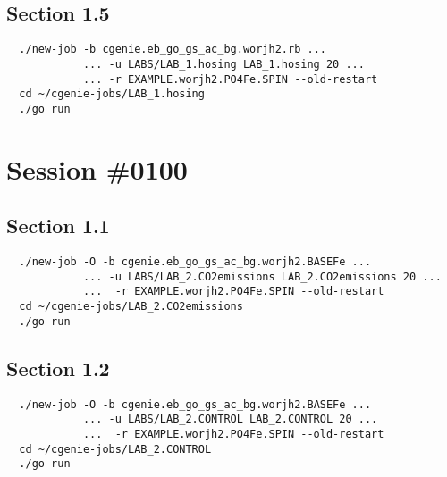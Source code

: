 \documentclass[a4paper,10pt,article]{memoir}
\begin{document}
\subsection*{Section 1.5}

\begin{verbatim}
  ./new-job -b cgenie.eb_go_gs_ac_bg.worjh2.rb ...
            ... -u LABS/LAB_1.hosing LAB_1.hosing 20 ...
            ... -r EXAMPLE.worjh2.PO4Fe.SPIN --old-restart
  cd ~/cgenie-jobs/LAB_1.hosing
  ./go run
\end{verbatim}

\section{Session \#0100}

\subsection*{Section 1.1}

\begin{verbatim}
  ./new-job -O -b cgenie.eb_go_gs_ac_bg.worjh2.BASEFe ...
            ... -u LABS/LAB_2.CO2emissions LAB_2.CO2emissions 20 ...
            ...  -r EXAMPLE.worjh2.PO4Fe.SPIN --old-restart
  cd ~/cgenie-jobs/LAB_2.CO2emissions
  ./go run
\end{verbatim}

\subsection*{Section 1.2}

\begin{verbatim}
  ./new-job -O -b cgenie.eb_go_gs_ac_bg.worjh2.BASEFe ...
            ... -u LABS/LAB_2.CONTROL LAB_2.CONTROL 20 ...
            ...  -r EXAMPLE.worjh2.PO4Fe.SPIN --old-restart
  cd ~/cgenie-jobs/LAB_2.CONTROL
  ./go run
\end{verbatim}
\end{document}

